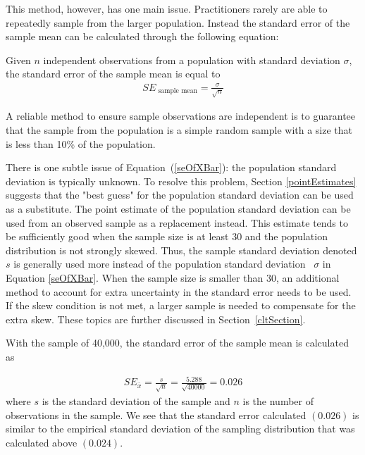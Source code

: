 This method, however, has one main issue. Practitioners rarely are able to repeatedly sample from the larger population. Instead the standard error of the sample mean can be calculated through the following equation: 

\begin{termBox}{
Given $n$ independent observations from a population with standard deviation $\sigma$, the standard error of the sample mean is equal to \vspace{-1mm}
\begin{eqnarray}
SE_{\text{ sample mean}} = \frac{\sigma}{\sqrt{n}}
\label{seOfXBar}
\end{eqnarray}\vspace{-3mm}%

A reliable method to ensure sample observations are independent is to guarantee that the sample from the population is a simple random sample with a size that is less than 10\% of the population.
}
\end{termBox}

There is one subtle issue of Equation~(\ref{seOfXBar}): the population standard deviation is typically unknown. To resolve this problem, Section \ref{pointEstimates} suggests that the "best guess" for the population standard deviation can be used as a substitute. The point estimate of the population standard deviation can be used from an observed sample as a replacement instead. This estimate tends to be sufficiently good when the sample size is at least 30 and the population distribution is not strongly skewed. Thus, the sample standard deviation denoted $s$ is generally used more instead of the population standard deviation ~$\sigma$ in Equation \ref{seOfXBar}. When the sample size is smaller than 30, an additional method to account for extra uncertainty in the standard error needs to be used. If the skew condition is not met, a larger sample is needed to compensate for the extra skew. These topics are further discussed in Section~\ref{cltSection}. 

With the  sample of 40,000, the standard error of the sample mean is calculated as

\begin{eqnarray*}
SE_{\bar{x}} = \frac{s}{\sqrt{n}} = \frac{5.288}{\sqrt{40000}} =  0.026
\end{eqnarray*}
where $s$ is the standard deviation of the sample and $n$ is the number of observations in the sample. We see that the standard error calculated $(0.026)$ is similar to the empirical standard deviation of the sampling distribution that was calculated above $(0.024)$. 

